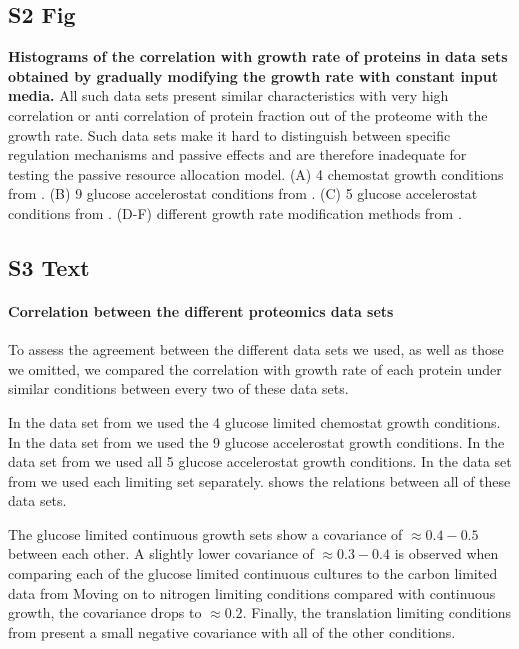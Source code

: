 \documentclass[10pt,letterpaper]{article}
\begin{document}
\subsection*{S2 Fig}
\label{fig:grcorr_dbs}
    {\bf Histograms of the correlation with growth rate of proteins in data sets obtained by gradually modifying the growth rate with constant input media.}
All such data sets present similar characteristics with very high correlation or anti correlation of protein fraction out of the proteome with the growth rate.
Such data sets make it hard to distinguish between specific regulation mechanisms and passive effects and are therefore inadequate for testing the passive resource allocation model.
(A) 4 chemostat growth conditions from \cite{Schmidt2015}.
(B) 9 glucose accelerostat conditions from \cite{Peebo_2015}.
(C) 5 glucose accelerostat conditions from \cite{Valgepea2013}.
(D-F) different growth rate modification methods from \cite{Hui_2015}.


\subsection*{S3 Text}
\label{dbscorr}
\paragraph{Correlation between the different proteomics data sets}
To assess the agreement between the different data sets we used, as well as those we omitted, we compared the correlation with growth rate of each protein under similar conditions between every two of these data sets.

In the data set from \cite{Schmidt2015} we used the 4 glucose limited chemostat growth conditions.
In the data set from \cite{Peebo_2015} we used the 9 glucose accelerostat growth conditions.
In the data set from \cite{Valgepea2013} we used all 5 glucose accelerostat growth conditions.
In the data set from \cite{Hui_2015} we used each limiting set separately.
 shows the relations between all of these data sets.

The glucose limited continuous growth sets show a covariance of $\approx 0.4-0.5$ between each other.
A slightly lower covariance of $\approx 0.3-0.4$ is observed when comparing each of the glucose limited continuous cultures to the carbon limited data from \cite{Hui_2015}
Moving on to nitrogen limiting conditions compared with continuous growth, the covariance drops to $\approx 0.2$.
Finally, the translation limiting conditions from \cite{Hui_2015} present a small negative covariance with all of the other conditions.
\end{document}
